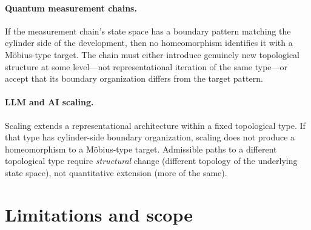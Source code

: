 \documentclass[11pt]{article}
\begin{document}
\paragraph{Quantum measurement chains.}
If the measurement chain's state space has a boundary pattern matching the
cylinder side of the development, then no homeomorphism identifies it with a
M\"obius-type target.  The chain must either introduce genuinely new
topological structure at some level---not representational iteration of the
same type---or accept that its boundary organization differs from the target
pattern.

\paragraph{LLM and AI scaling.}
Scaling extends a representational architecture within a fixed topological
type. If that type has cylinder-side boundary organization, scaling does not
produce a homeomorphism to a M\"obius-type target.
Admissible paths to a different topological type require
\emph{structural} change (different topology of the underlying state
space), not quantitative extension (more of the same).

\section{Limitations and scope}
\label{sec:limits}
\end{document}
